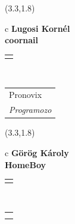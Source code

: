 \documentclass[11pt]{article}
\begin{document}
\makebox(3.3,1.8){
  \renewcommand\arraystretch{1.3}
  \begin{tabular}[c]{c}
    \hspace{8.5mm}
    \LARGE\bf{ Lugosi Kornél }\\
    \hspace{8.5mm}
    \Large{ coornail }\\
    \renewcommand\arraystretch{3}
    \begin{tabular}[c]{c}
      \centering
      \fontfamily{phv}\selectfont{
        \textbf{
          \textsc{
            \scriptsize{
            \color{Bright}{ Ismerkedő }\color{Bright}{ Webmester }\color{Bright}{ Sminkmester }\color{Dark}{ Programozó }
            }
          }
        }
      }
    \end{tabular}
    \\
    \renewcommand\arraystretch{1}
    \begin{tabular}{p{3.3in}}
      \hspace{.7cm}Pronovix\\
      \hspace{.7cm}\emph{ Programozo }\\
    \end{tabular}
  \end{tabular}
}

\makebox(3.3,1.8){
  \renewcommand\arraystretch{1.3}
  \begin{tabular}[c]{c}
    \hspace{8.5mm}
    \LARGE\bf{ Görög Károly }\\
    \hspace{8.5mm}
    \Large{ HomeBoy }\\
    \renewcommand\arraystretch{3}
    \begin{tabular}[c]{c}
      \centering
      \fontfamily{phv}\selectfont{
        \textbf{
          \textsc{
            \scriptsize{
            \color{Dark}{ Ismerkedő }\color{Dark}{ Webmester }\color{Bright}{ Sminkmester }\color{Bright}{ Programozó }
            }
          }
        }
      }
    \end{tabular}
    \\
    \renewcommand\arraystretch{1}
    \begin{tabular}{p{3.3in}}
      \hspace{.7cm}\\
      \hspace{.7cm}\emph{  }\\
    \end{tabular}
  \end{tabular}
}
\end{document}
